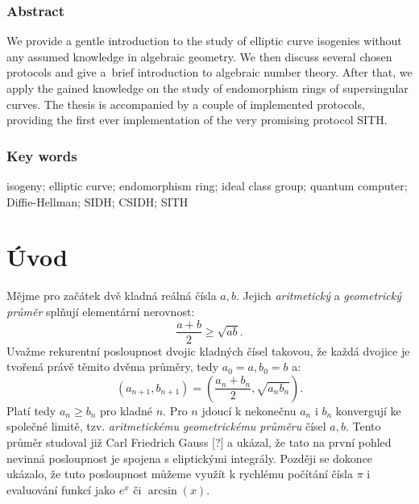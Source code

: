\documentclass[12pt]{report}
\begin{document}
\vspace*{4cm}

\subsection*{Abstract}
We provide a gentle introduction to the study of elliptic curve isogenies without any assumed knowledge in algebraic geometry. We then discuss several chosen protocols and give a~brief introduction to algebraic number theory. After that, we apply the gained knowledge on the study of endomorphism rings of supersingular curves. The thesis is accompanied by a couple of implemented protocols, providing the first ever implementation of the very promising protocol SITH.

\subsection*{Key words}
isogeny; elliptic curve; endomorphism ring; ideal class group; quantum computer; Diffie-Hellman; SIDH; CSIDH; SITH





{
\hypersetup{linkcolor=black}
\tableofcontents
}
\thispagestyle{empty}

\chapter*{Úvod}

Mějme pro začátek dvě kladná reálná čísla $a,b$. Jejich \textit{aritmetický} a \textit{geometrický průměr} splňují elementární nerovnost:
$$\frac{a+b}{2} \geqslant \sqrt{ab}.$$
Uvažme rekurentní posloupnost dvojic kladných čísel takovou, že každá dvojice je tvořená právě těmito dvěma průměry, tedy $a_0 = a, b_0 = b$ a:
\begin{equation*}
(a_{n+1},b_{n+1}) = \left(\frac{a_n+b_n}{2}, \sqrt{a_n b_n} \right).
\end{equation*}
Platí tedy $a_n \geqslant b_n$ pro kladné $n$. Pro $n$ jdoucí k nekonečnu $a_n$ i $b_n$ konvergují ke společné limitě, tzv. \textit{aritmetickému geometrickému průměru} čísel $a,b$. Tento průměr studoval již Carl Friedrich Gauss [?] a ukázal, že tato na první pohled nevinná posloupnost je spojena s eliptickými integrály. Později se dokonce ukázalo, že tuto posloupnost můžeme využít k rychlému počítání čísla $\pi$ i evaluování funkcí jako $e^x$ či $\arcsin(x)$. 
\end{document}
